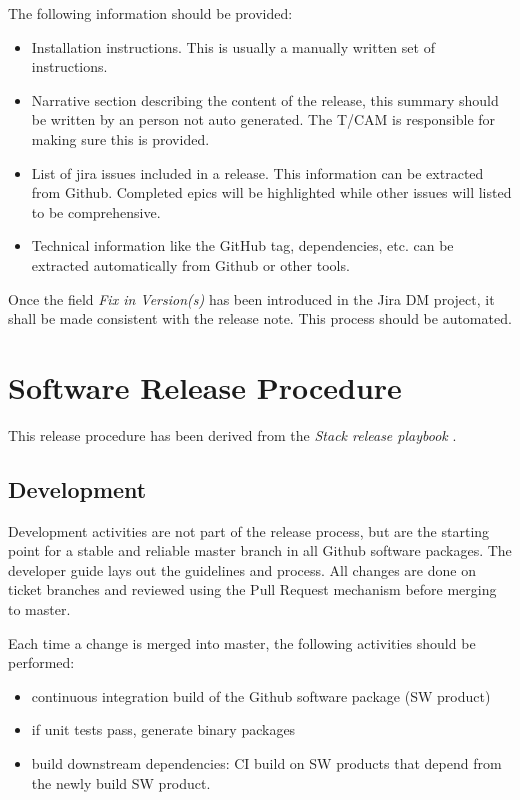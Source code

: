 The following information should be  provided:
\begin{itemize}
\item Installation instructions. This is usually a manually written set of instructions.
\item Narrative section describing the content of the release, this summary should be written by an person not auto generated.
The T/CAM is responsible for making sure this is provided.
\item List of jira issues included in a release. This information can be extracted from Github. Completed epics will be highlighted while other issues will  listed to be comprehensive.
\item Technical information like the GitHub tag, dependencies,  etc. can be extracted automatically from Github or other tools.
\end{itemize}

Once the field \textit{Fix in Version(s)} has been introduced in the Jira DM project, it shall be made consistent with the release note. This process should be automated.


\newpage
\section{Software Release Procedure} \label{sec:releaseprocedure}

This release procedure has been derived from the \textit{Stack release playbook} .

\subsection{Development} \label{sec:dev}

Development activities are not part of the release process, but are the starting point for a stable and reliable master branch in all Github software packages.
The  developer guide lays out the guidelines and process. All changes are done on ticket branches and reviewed using the Pull Request mechanism before merging to master.

Each time a change is merged into master, the following activities should be performed:

\begin{itemize}
\item continuous integration build of the Github software package (SW product)
\item if unit tests pass, generate binary packages
\item build downstream dependencies: CI build on SW products that depend from the newly build SW product.
\end{itemize}

